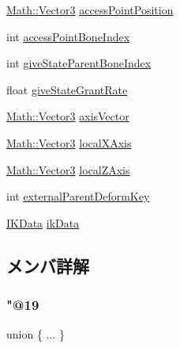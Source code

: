 \begin{DoxyCompactItemize}
\begin{tabbing}
\end{tabbing}\item 
\mbox{\hyperlink{struct_math_1_1_vector3}{Math\+::\+Vector3}} \mbox{\hyperlink{struct_p_m_x_1_1_bone_data_a587fcec455aec1e00128c1f0fafcbb1c}{access\+Point\+Position}}
\item 
int \mbox{\hyperlink{struct_p_m_x_1_1_bone_data_a0bc309efca317aae5bca1cff35985013}{access\+Point\+Bone\+Index}}
\item 
int \mbox{\hyperlink{struct_p_m_x_1_1_bone_data_a2b226de6cb0e5af7f0f5ab21a587f38d}{give\+State\+Parent\+Bone\+Index}}
\item 
float \mbox{\hyperlink{struct_p_m_x_1_1_bone_data_a5d4de4bd0bc40b19d1f3c52e67222259}{give\+State\+Grant\+Rate}}
\item 
\mbox{\hyperlink{struct_math_1_1_vector3}{Math\+::\+Vector3}} \mbox{\hyperlink{struct_p_m_x_1_1_bone_data_a739f41a18242d2edbd73bc2c07fb03ad}{axis\+Vector}}
\item 
\mbox{\hyperlink{struct_math_1_1_vector3}{Math\+::\+Vector3}} \mbox{\hyperlink{struct_p_m_x_1_1_bone_data_ac8bb12b7f072bbcca9ba3e32509b2ec0}{local\+X\+Axis}}
\item 
\mbox{\hyperlink{struct_math_1_1_vector3}{Math\+::\+Vector3}} \mbox{\hyperlink{struct_p_m_x_1_1_bone_data_a6207a9096eefe208eb9f73b136796c13}{local\+Z\+Axis}}
\item 
int \mbox{\hyperlink{struct_p_m_x_1_1_bone_data_ae25e41102c94106d38e9d52e39db4a94}{external\+Parent\+Deform\+Key}}
\item 
\mbox{\hyperlink{struct_p_m_x_1_1_i_k_data}{I\+K\+Data}} \mbox{\hyperlink{struct_p_m_x_1_1_bone_data_a5c05d33f5ea06ad831bba4a2a02d4ebe}{ik\+Data}}
\end{DoxyCompactItemize}


\subsection{メンバ詳解}
\mbox{\label{struct_p_m_x_1_1_bone_data_aaf3c987bf1566241f5af887a40a4bb34}} 
\subsubsection{\texorpdfstring{"@19}{@19}}
{\footnotesize\ttfamily union \{ ... \} }

\mbox{\label{struct_p_m_x_1_1_bone_data_a0bc309efca317aae5bca1cff35985013}} 
